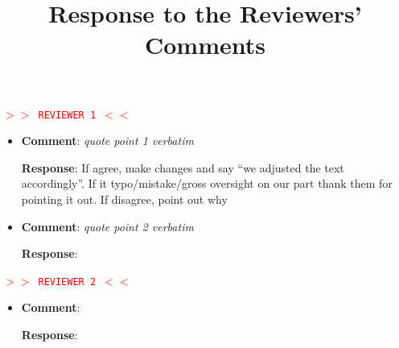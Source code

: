 \documentclass[]{article}
\title{Response to the Reviewers' Comments}
\author{}
\newcommand{\pointRaised}[1]{\textbf{Comment}: {\itshape #1} \par }
\newcommand{\response}[1]{\textbf{Response}: {#1}}
\begin{document}
\maketitle


\textcolor{red}{
\tt $>>$ REVIEWER 1 $<<$
}

\begin{itemize}

\item
\pointRaised{quote point 1 verbatim}
\response{If agree, make changes and say ``we adjusted the text accordingly''. If it typo/mistake/gross oversight on our part thank them for pointing it out. If disagree, point out why}

\item \pointRaised{quote point 2 verbatim}

\response{}

\end{itemize}

\textcolor{red}{
\tt $>>$ REVIEWER 2 $<<$
}

\begin{itemize}

\item
\pointRaised{}
\response{}

\end{itemize}
\end{document}
